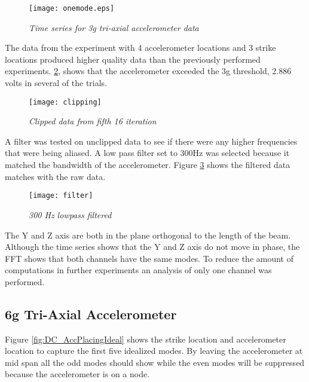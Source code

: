 \begin{figure}[H]
\centering
\texttt{[image: onemode.eps]}
\caption{\textit{Time series for 3g tri-axial accelerometer data}}
\label{fig:onemode}
\end{figure}

The data from the experiment with 4 accelerometer locations and 3 strike locations produced higher quality data than the previously performed experiments. \ref{fig:clipping}, shows that the accelerometer exceeded the 3g threshold, 2.886 volts in several of the trials. 

\begin{figure}[H]
\centering
\texttt{[image: clipping]}
\caption{\textit{Clipped data from fifth 16 iteration}}
\label{fig:clipping}
\end{figure}

A filter was tested on unclipped data to see if there were any higher frequencies that were being aliased. A low pass filter set to 300Hz was selected because it matched the bandwidth of the accelerometer. Figure \ref{fig:filter} shows the filtered data matches with the raw data. 

\begin{figure}[H]
\centering
\texttt{[image: filter]}
\caption{\textit{300 Hz lowpass filtered}}
\label{fig:filter}
\end{figure}

\indent The Y and Z axis are both in the plane orthogonal to the length of the beam. Although the time series shows that the Y and Z axis do not move in phase, the FFT shows that both channels have the same modes. To reduce the amount of computations in further experiments an analysis of only one channel was performed.

\subsection{6g Tri-Axial Accelerometer}
\indent Figure \ref{fig:DC_AccPlacingIdeal} shows the strike location and accelerometer location to capture the first five idealized modes. By leaving the accelerometer at mid span all the odd modes should show while the even modes will be suppressed because the accelerometer is on a node. 

